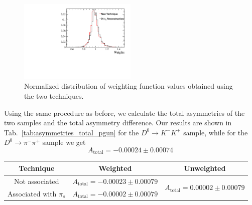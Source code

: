 \documentclass{article}
\begin{document}
        \begin{figure}[h!]
                \centering
                \includegraphics[width = 0.5\textwidth]{../work/RapidSimAnalysis/PGunAnalysis/Plots/Weights.pdf}
                \caption{Normalized distribution of weighting function values obtained using the two techniques.}
                \label{fig:weightingPgun}
        \end{figure}

        Using the same procedure as before, we calculate the total asymmetries of the two samples and the total asymmetry difference.
        Our results are shown in Tab.~\ref{tab:asymmetries_total_pgun} for the $D^0\to K^-K^+$ sample, while for the $D^0\to\pi^-\pi^+$ sample we get
        \begin{equation}
                A_\text{total} = -0.00024 \pm 0.00074
        \end{equation}
        \begin{center}
                \begin{tabular}{c|c|c}
                        Technique & Weighted & Unweighted\\
                        \hline\hline
                        Not associated & $A_\text{total} = - 0.00023 \pm 0.00079$ & \multirow{2}{*}{$A_\text{total} = 0.00002 \pm 0.00079$}\\
                        \cline{1-2}
                        Associated with $\pi_s$ & $A_\text{total} = -0.00002 \pm 0.00079$ & \\
                \end{tabular}
                \label{tab:asymmetries_total_pgun}
        \end{center}
\end{document}
